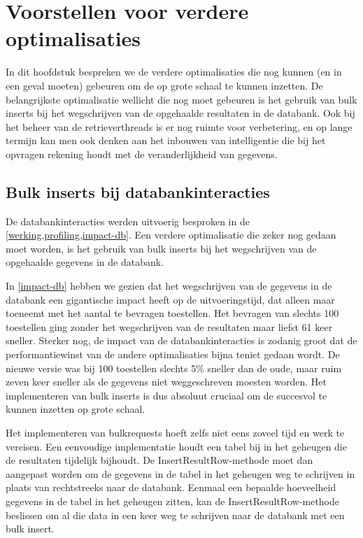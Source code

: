 \chapter{Voorstellen voor verdere optimalisaties}

In dit hoofdstuk bespreken we de verdere optimalisaties die nog kunnen (en in een geval moeten) gebeuren om de \nwmretriever{} op grote schaal te kunnen inzetten.
De belangrijkste optimalisatie wellicht die nog moet gebeuren is het gebruik van bulk inserts bij het wegschrijven van de opgehaalde resultaten in de databank.
Ook bij het beheer van de retrieverthreads is er nog ruimte voor verbetering,
en op lange termijn kan men ook denken aan het inbouwen van intelligentie die bij het opvragen rekening houdt met de veranderlijkheid van gegevens.


\section{Bulk inserts bij databankinteracties}

De databankinteracties werden uitvoerig besproken in de \cref{werking,profiling,impact-db}.
Een verdere optimalisatie die zeker nog gedaan moet worden,
is het gebruik van bulk inserts bij het wegschrijven van de opgehaalde gegevens in de databank.

In \cref{impact-db} hebben we gezien dat het wegschrijven van de gegevens in de databank een gigantische impact heeft op de uitvoeringstijd,
dat alleen maar toeneemt met het aantal te bevragen toestellen.
Het bevragen van slechts 100 toestellen ging zonder het wegschrijven van de resultaten maar liefst 61 keer sneller.
Sterker nog, de impact van de databankinteracties is zodanig groot dat de performantiewinst van de andere optimalisaties bijna teniet gedaan wordt.
De nieuwe versie was bij 100 toestellen slechts 5\% sneller dan de oude, maar ruim zeven keer sneller als de gegevens niet weggeschreven moesten worden.
Het implementeren van bulk inserts is dus absoluut cruciaal om de \nwmretriever{} succesvol te kunnen inzetten op grote schaal.

Het implementeren van bulkrequests hoeft zelfs niet eens zoveel tijd en werk te vereisen.
Een eenvoudige implementatie houdt een tabel bij in het geheugen die de resultaten tijdelijk bijhoudt.
De InsertResultRow-methode moet dan aangepast worden om de gegevens in de tabel in het geheugen weg te schrijven in plaats van rechtstreeks naar de databank.
Eenmaal een bepaalde hoeveelheid gegevens in de tabel in het geheugen zitten, kan de InsertResultRow-methode beslissen om al die data
in een keer weg te schrijven naar de databank met een bulk insert.

